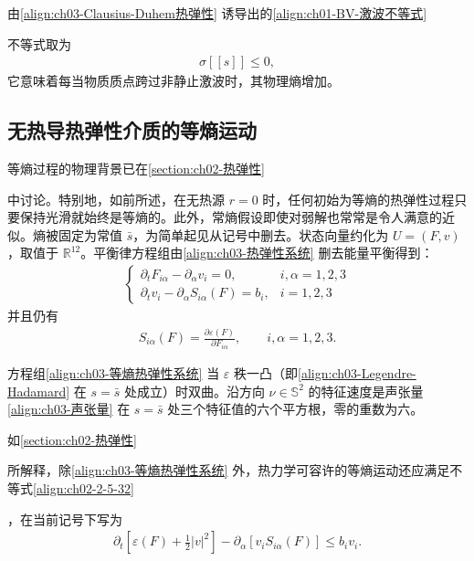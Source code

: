 ﻿\documentclass[../../main.tex]{subfiles}
\begin{document}
由\eqref{align:ch03-Clausius-Duhem热弹性} 诱导出的\eqref{align:ch01-BV-激波不等式}%

不等式取为
\begin{align}
\sigma[\![s]\!]\leqslant0,
\label{align:ch03-熵增条件热弹性}
\end{align}
它意味着每当物质质点跨过非静止激波时，其物理熵增加。

\subsection{无热导热弹性介质的等熵运动}\label{subsection:ch03-等熵热弹性}

等熵过程的物理背景已在\cref{section:ch02-热弹性}%

中讨论。特别地，如前所述，在无热源 $r=0$ 时，任何初始为等熵的热弹性过程只要保持光滑就始终是等熵的。此外，常熵假设即使对弱解也常常是令人满意的近似。熵被固定为常值 $\bar{s}$，为简单起见从记号中删去。状态向量约化为 $U=(F,v)$，取值于 $\mathbb{R}^{12}$。平衡律方程组由\eqref{align:ch03-热弹性系统} 删去能量平衡得到：
\begin{align}
\begin{cases}
\partial_{t}F_{i\alpha}-\partial_{\alpha}v_{i}=0, & i,\alpha=1,2,3\\
\partial_{t}v_{i}-\partial_{\alpha}S_{i\alpha}(F)=b_{i}, & i=1,2,3
\end{cases}
\label{align:ch03-等熵热弹性系统}
\end{align}
并且仍有
\begin{align}
S_{i\alpha}(F)=\frac{\partial\varepsilon(F)}{\partial F_{i\alpha}},\qquad i,\alpha=1,2,3.
\label{align:ch03-等熵热弹性本构}
\end{align}

方程组\eqref{align:ch03-等熵热弹性系统} 当 $\varepsilon$ 秩一凸（即\eqref{align:ch03-Legendre-Hadamard} 在 $s=\bar{s}$ 处成立）时双曲。沿方向 $\nu\in\mathbb{S}^{2}$ 的特征速度是声张量\eqref{align:ch03-声张量} 在 $s=\bar{s}$ 处三个特征值的六个平方根，零的重数为六。

如\cref{section:ch02-热弹性}%

所解释，除\eqref{align:ch03-等熵热弹性系统} 外，热力学可容许的等熵运动还应满足不等式\eqref{align:ch02-2-5-32}%

，在当前记号下写为
\begin{align}
\partial_{t}\left[\varepsilon(F)+\frac{1}{2}|v|^{2}\right]-\partial_{\alpha}\left[v_{i}S_{i\alpha}(F)\right]\leqslant b_{i}v_{i}.
\label{align:ch03-等熵能量不等式}
\end{align}
\end{document}
